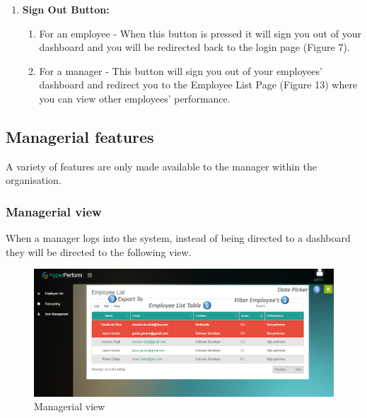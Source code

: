 \documentclass[11pt,a4paper]{article}
\begin{document}
\begin{enumerate}
	\item \textbf{Sign Out Button:}
		\begin{enumerate}
			\item For an employee - When this button is pressed it will sign you out of your dashboard and you will be redirected back to the login page (Figure 7).
			\item For a manager - This button will sign you out of your employees' dashboard and redirect you to the Employee List Page (Figure 13) where you can view other employees' performance.
		\end{enumerate} 
\end{enumerate}


\pagebreak

\subsection{Managerial features}
A variety of features are only made available to the manager within the organisation.

\subsubsection{Managerial view}
When a manager logs into the system, instead of being directed to a dashboard they will be directed to the following view.

\begin{figure}[H]
	\begin{center}
		\includegraphics[width=\linewidth]{../Images/Getting_Started/Man_page_numbered}
		\caption{Managerial view}
	\end{center}
\end{figure}
\end{document}
